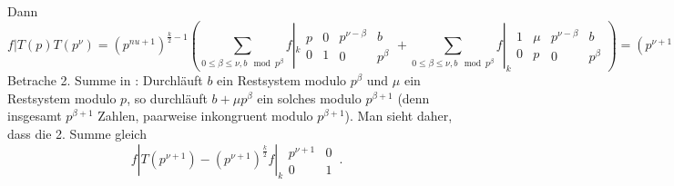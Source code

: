 \begin{bewe}
	Dann
	\[
		f|T(p)T(p^\nu) = (p^{nu+1})^{\frac{k}{2}-1} ( \sum_{0 \leq \beta \leq \nu, b \mod p^\beta} f|_k \begin{smallmatrix} p & 0 \\ 0 & 1 \end{smallmatrix}\begin{smallmatrix}p^{\nu-\beta} & b \\ 0 & p^\beta \end{smallmatrix} + \sum_{0 \leq \beta \leq \nu, b \mod p^\beta} f|_k \begin{smallmatrix} 1 & \mu \\ 0 & p \end{smallmatrix}\begin{smallmatrix}p^{\nu-\beta} & b \\ 0 & p^\beta \end{smallmatrix})
		= (p^{\nu+1})^{\frac{k}{2}-1} ( \sum_{0 \leq \beta \leq \nu, b \mod p^\beta} f|_k \begin{smallmatrix} p^{\nu +1-\beta} & pb \\ 0 & p^\beta \end{smallmatrix} + \sum_{0 \leq \beta \leq \nu, b \mod p^\beta, \mu(p)} f|_k \begin{smallmatrix}
		p^{nu-\beta} & b+\mu p^\beta \\ 0 & p^{\beta+1}
		\end{smallmatrix}) \tag{*}
	\]
	Betrache 2. Summe in \myref{(*)}:
	Durchläuft $b$ ein Restsystem modulo $p^\beta$ und $\mu$ ein Restsystem modulo $p$, so durchläuft $b+\mu p^\beta$ ein solches modulo $p^{\beta+1}$ (denn insgesamt $p^{\beta+1}$ Zahlen, paarweise inkongruent modulo $p^{\beta+1}$).
	Man sieht daher, dass die 2. Summe gleich
	\[
		f|T(p^{\nu+1}) - (p^{\nu+1})^{\frac{k}{2}} f|_k \begin{smallmatrix} p^{\nu+1} & 0 \\ 0 & 1 \end{smallmatrix} \,.
	\]
	

\end{bewe}
